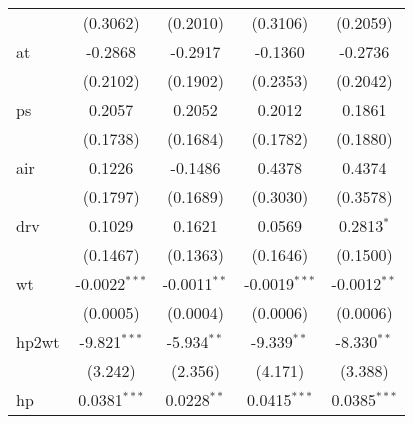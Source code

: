 \begin{tabular}{lcccc}
                                & (0.3062)                                    & (0.2010)               & (0.3106)              & (0.2059)             \\
   at                           & -0.2868                                     & -0.2917                & -0.1360               & -0.2736              \\
                                & (0.2102)                                    & (0.1902)               & (0.2353)              & (0.2042)             \\
   ps                           & 0.2057                                      & 0.2052                 & 0.2012                & 0.1861               \\
                                & (0.1738)                                    & (0.1684)               & (0.1782)              & (0.1880)             \\
   air                          & 0.1226                                      & -0.1486                & 0.4378                & 0.4374               \\
                                & (0.1797)                                    & (0.1689)               & (0.3030)              & (0.3578)             \\
   drv                          & 0.1029                                      & 0.1621                 & 0.0569                & 0.2813$^{*}$         \\
                                & (0.1467)                                    & (0.1363)               & (0.1646)              & (0.1500)             \\
   wt                           & -0.0022$^{***}$                             & -0.0011$^{**}$         & -0.0019$^{***}$       & -0.0012$^{**}$       \\
                                & (0.0005)                                    & (0.0004)               & (0.0006)              & (0.0006)             \\
   hp2wt                        & -9.821$^{***}$                              & -5.934$^{**}$          & -9.339$^{**}$         & -8.330$^{**}$        \\
                                & (3.242)                                     & (2.356)                & (4.171)               & (3.388)              \\
   hp                           & 0.0381$^{***}$                              & 0.0228$^{**}$          & 0.0415$^{***}$        & 0.0385$^{***}$       \\

\end{tabular}
